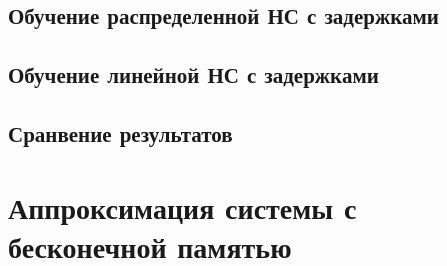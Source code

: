 
\subsection{Обучение распределенной НС с задержками}


\subsection{Обучение линейной НС с задержками}


\subsection{Сранвение результатов}


\newpage

\section{Аппроксимация системы с бесконечной памятью}

